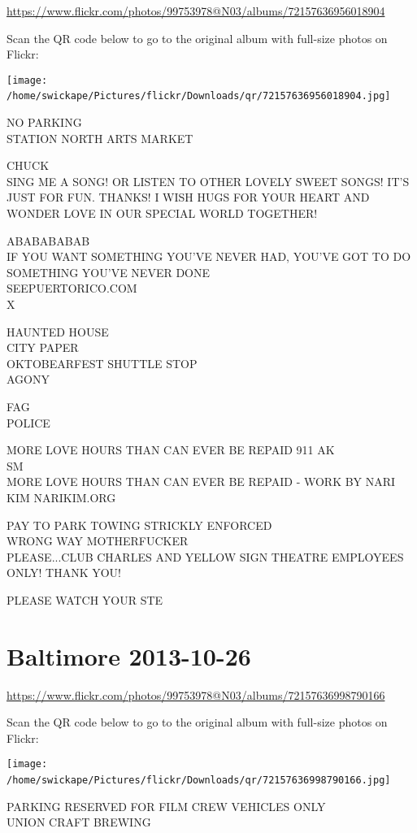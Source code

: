 \documentclass[10pt,letterpaper]{article}
\begin{document}
\url{https://www.flickr.com/photos/99753978@N03/albums/72157636956018904}

Scan the QR code below to go to the original album with full-size photos on Flickr:

\texttt{[image: /home/swickape/Pictures/flickr/Downloads/qr/72157636956018904.jpg]}
\

NO PARKING\\
STATION NORTH ARTS MARKET

CHUCK\\
SING ME A SONG!  OR LISTEN TO OTHER LOVELY SWEET SONGS! IT'S JUST FOR FUN. THANKS! I WISH HUGS FOR YOUR HEART AND WONDER LOVE IN OUR SPECIAL WORLD TOGETHER!

ABABABABAB\\
IF YOU WANT SOMETHING YOU'VE NEVER HAD, YOU'VE GOT TO DO SOMETHING YOU'VE NEVER DONE\\
SEEPUERTORICO.COM\\
X

HAUNTED HOUSE\\
CITY PAPER\\
OKTOBEARFEST SHUTTLE STOP\\
AGONY

FAG\\
POLICE

MORE LOVE HOURS THAN CAN EVER BE REPAID 911 AK\\
SM\\
MORE LOVE HOURS THAN CAN EVER BE REPAID {-} WORK BY NARI KIM NARIKIM.ORG

PAY TO PARK TOWING STRICKLY ENFORCED\\
WRONG WAY MOTHERFUCKER\\
PLEASE...CLUB CHARLES AND YELLOW SIGN THEATRE EMPLOYEES ONLY!  THANK YOU!

PLEASE WATCH YOUR STE
\

\section*{Baltimore 2013-10-26}

\url{https://www.flickr.com/photos/99753978@N03/albums/72157636998790166}

Scan the QR code below to go to the original album with full-size photos on Flickr:

\texttt{[image: /home/swickape/Pictures/flickr/Downloads/qr/72157636998790166.jpg]}
\

PARKING RESERVED FOR FILM CREW VEHICLES ONLY\\
UNION CRAFT BREWING
\end{document}
